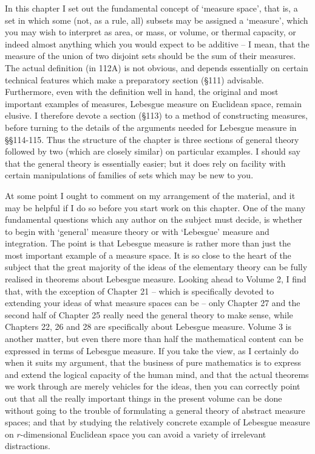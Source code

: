 
\def\chaptername{Measure spaces}
\def\sectionname{Introduction}


In this chapter I set out the fundamental concept of `measure space',
that is, a set in which some (not, as a rule, all) subsets may be
assigned a `measure', which you may wish to interpret as area, or
mass, or volume, or thermal capacity, or indeed almost anything which
you would expect to be additive -- I mean, that the measure of the union
of two disjoint sets should be the sum of their measures.   The actual
definition (in 112A) is not obvious, and depends essentially on certain
technical features which make a preparatory section (\S111) advisable.
Furthermore, even with the definition well in hand, the original and
most important examples of measures, Lebesgue measure on Euclidean
space, remain elusive.   I therefore devote a section (\S113) to a
method of constructing measures, before turning to the details of the
arguments needed for Lebesgue measure in \S\S114-115.   Thus the
structure of the chapter is three sections of general theory followed by
two (which are closely similar) on particular examples.   I should say
that the general theory is essentially easier;  
but it does rely on facility with certain manipulations of families of 
sets which may be new to you.

At some point I ought to comment on my arrangement of the material, and
it may be helpful if I do so before you start work on this chapter.
One of the many fundamental questions which any author on the subject
must decide, is whether to begin with `general' measure theory or
with `Lebesgue' measure and integration.   The point is that Lebesgue
measure is rather more than just the most important example of a measure
space.   It is so close to the heart of the subject that the great
majority of the ideas of the elementary theory can be fully realised
in theorems about Lebesgue measure.   Looking ahead to Volume 2, I find
that, with the exception of Chapter 21 -- which is specifically devoted
to extending your ideas of what measure spaces can be -- only
Chapter 27 and the second half of Chapter 25 really need the general
theory to make sense, while
Chapters 22, 26 and 28 are specifically about Lebesgue measure.   Volume
3 is another matter, but even there more than half the mathematical
content can be expressed in terms of Lebesgue measure.   If you
take the view, as I certainly do when it suits my argument, that the
business of pure mathematics is to express and extend the logical
capacity of the human mind, and that the actual theorems we work through
are merely vehicles for the ideas, then you can correctly point out that
all the really important things in the present volume can be done
without going to the trouble of formulating a general theory of abstract
measure spaces;  and that by studying the relatively concrete example of
Lebesgue measure on
$r$-dimensional Euclidean space you can avoid a variety of irrelevant
distractions.

